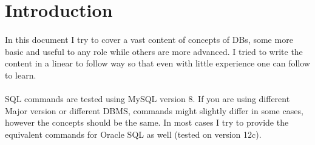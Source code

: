 
\newpage
\section{Introduction}
\paragraph{} In this document I try to cover a vast content of concepts of
\aclp{DB}, some more basic and useful to any role while others are more advanced. I tried to write the content in a linear to follow way so that even with little experience one can follow to learn.
\paragraph{} \acs{SQL} commands are tested using My\acs{SQL} version 8. If you are using different Major version or different \acs{DBMS}, commands might slightly differ in some cases, however the concepts should be the same. In most cases I try to provide the equivalent commands for Oracle \acs{SQL} as well (tested on version 12c).
